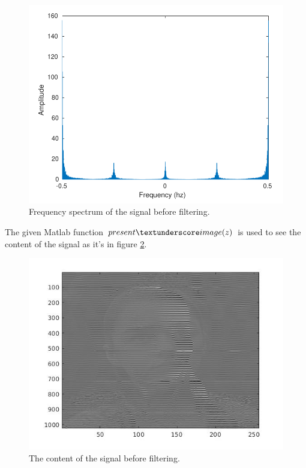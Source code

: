 \documentclass[a4paper,twocolumn]{article}
\begin{document}
\begin{figure}[H]
  \begin{center}
    \includegraphics[width=0.9\columnwidth]{freq1corped.pdf}
  \end{center}
  \caption{Frequency spectrum of the signal before filtering.}
  \label{fig:spectrum1}
\end{figure}
\noindent
The given Matlab function $present\textunderscore image(z)$ is used to see the content of the signal as it's in figure \ref{fig:unfiltre_image}.
\begin{figure}[H]
  \begin{center}
    \includegraphics[width=0.83\columnwidth]{pic_sent.jpg}
  \end{center}
  \caption{The content of the signal before filtering.}
  \label{fig:unfiltre_image}
\end{figure}
\end{document}
